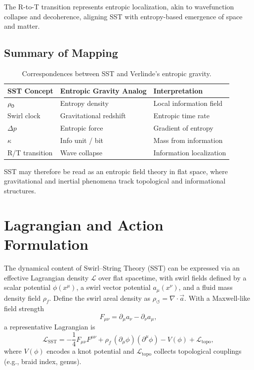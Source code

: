 \documentclass[11pt]{article}
\newcommand{\swirlarrow}{%
    \mathchoice{\mkern-2mu\scriptstyle\boldsymbol{\circlearrowleft}}%
    {\mkern-2mu\scriptstyle\boldsymbol{\circlearrowleft}}%
    {\mkern-2mu\scriptscriptstyle\boldsymbol{\circlearrowleft}}%
    {\mkern-2mu\scriptscriptstyle\boldsymbol{\circlearrowleft}}%
}
\newcommand{\rhof}{\rho_{\!f}}                           %
\begin{document}
        The R-to-T transition represents entropic localization, akin to wavefunction collapse and decoherence, aligning SST with entropy-based emergence of space and matter.

    \subsection{Summary of Mapping}
        \begin{table}[h]
            \centering
            \begin{tabular}{lll}
                \toprule
                \textbf{SST Concept} & \textbf{Entropic Gravity Analog} & \textbf{Interpretation} \\
                \midrule
                $\rho_{\swirlarrow}$ & Entropy density & Local information field \\
                Swirl clock & Gravitational redshift & Entropic time rate \\
                $\Delta p$ & Entropic force & Gradient of entropy \\
                $\kappa$ & Info unit / bit & Mass from information \\
                R/T transition & Wave collapse & Information localization \\
                \bottomrule
            \end{tabular}
            \caption{Correspondences between SST and Verlinde's entropic gravity.}\label{tab:sst-entropic-mapping}
        \end{table}

        SST may therefore be read as an entropic field theory in flat space, where gravitational and inertial phenomena track topological and informational structures.

\section{Lagrangian and Action Formulation}
    The dynamical content of Swirl–String Theory (SST) can be expressed via an effective Lagrangian density $\mathcal{L}$ over flat spacetime, with swirl fields defined by a scalar potential $\phi(x^\mu)$, a swirl vector potential $a_\mu(x^\nu)$, and a fluid mass density field $\rhof$. Define the swirl areal density as $\rho_{\circlearrowleft} = \nabla \cdot \vec{a}$. With a Maxwell-like field strength
    \[
        F_{\mu\nu} = \partial_\mu a_\nu - \partial_\nu a_\mu,
    \]
    a representative Lagrangian is
    \[
        \mathcal{L}_{\text{SST}} = -\frac{1}{4} F_{\mu\nu} F^{\mu\nu} + \rhof\, (\partial_\mu \phi)(\partial^\mu \phi) - V(\phi) + \mathcal{L}_\text{topo},
    \]
    where $V(\phi)$ encodes a knot potential and $\mathcal{L}_\text{topo}$ collects topological couplings (e.g., braid index, genus).
\end{document}
